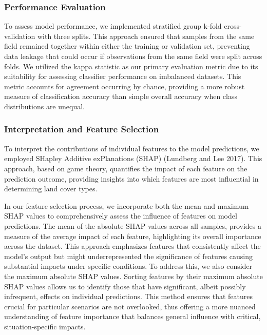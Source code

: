 \documentclass[
  journal,
  twocolumn]{IEEEtran}
\begin{document}
\hypertarget{performance-evaluation}{%
\subsubsection{Performance Evaluation}\label{performance-evaluation}}

To assess model performance, we implemented stratified group k-fold
cross-validation with three splits. This approach ensured that samples
from the same field remained together within either the training or
validation set, preventing data leakage that could occur if observations
from the same field were split across folds. We utilized the kappa
statistic as our primary evaluation metric due to its suitability for
assessing classifier performance on imbalanced datasets. This metric
accounts for agreement occurring by chance, providing a more robust
measure of classification accuracy than simple overall accuracy when
class distributions are unequal.

\hypertarget{interpretation-and-feature-selection}{%
\subsubsection{Interpretation and Feature
Selection}\label{interpretation-and-feature-selection}}

To interpret the contributions of individual features to the model
predictions, we employed SHapley Additive exPlanations (SHAP) (Lundberg
and Lee 2017). This approach, based on game theory, quantifies the
impact of each feature on the prediction outcome, providing insights
into which features are most influential in determining land cover
types.

In our feature selection process, we incorporate both the mean and
maximum SHAP values to comprehensively assess the influence of features
on model predictions. The mean of the absolute SHAP values across all
samples, provides a measure of the average impact of each feature,
highlighting its overall importance across the dataset. This approach
emphasizes features that consistently affect the model's output but
might underrepresented the significance of features causing substantial
impacts under specific conditions. To address this, we also consider the
maximum absolute SHAP values. Sorting features by their maximum absolute
SHAP values allows us to identify those that have significant, albeit
possibly infrequent, effects on individual predictions. This method
ensures that features crucial for particular scenarios are not
overlooked, thus offering a more nuanced understanding of feature
importance that balances general influence with critical,
situation-specific impacts.
\end{document}
